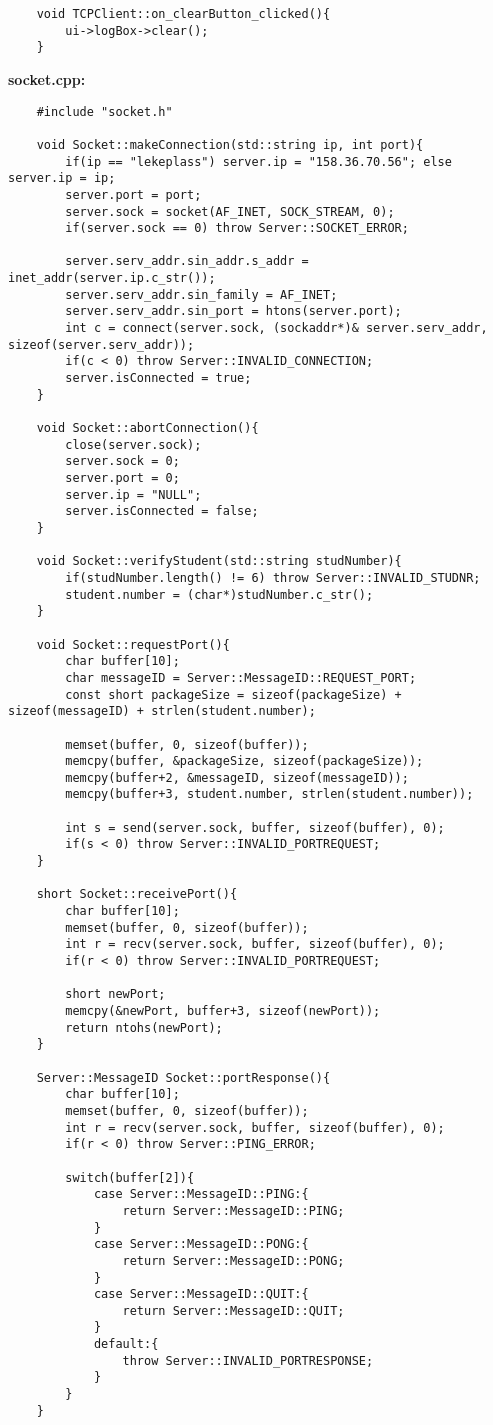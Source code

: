 \begin{lstlisting}
	void TCPClient::on_clearButton_clicked(){
		ui->logBox->clear();
	}
\end{lstlisting}

\newpage
\textbf{socket.cpp:}
\begin{lstlisting}
	#include "socket.h"

	void Socket::makeConnection(std::string ip, int port){
		if(ip == "lekeplass") server.ip = "158.36.70.56"; else server.ip = ip;
		server.port = port;
		server.sock = socket(AF_INET, SOCK_STREAM, 0);
		if(server.sock == 0) throw Server::SOCKET_ERROR;

		server.serv_addr.sin_addr.s_addr = inet_addr(server.ip.c_str());
		server.serv_addr.sin_family = AF_INET;
		server.serv_addr.sin_port = htons(server.port);
		int c = connect(server.sock, (sockaddr*)& server.serv_addr, sizeof(server.serv_addr));
		if(c < 0) throw Server::INVALID_CONNECTION;
		server.isConnected = true;
	}

	void Socket::abortConnection(){
		close(server.sock);
		server.sock = 0;
		server.port = 0;
		server.ip = "NULL";
		server.isConnected = false;
	}

	void Socket::verifyStudent(std::string studNumber){
		if(studNumber.length() != 6) throw Server::INVALID_STUDNR;
		student.number = (char*)studNumber.c_str();
	}

	void Socket::requestPort(){
		char buffer[10];
		char messageID = Server::MessageID::REQUEST_PORT;
		const short packageSize = sizeof(packageSize) + sizeof(messageID) + strlen(student.number);

		memset(buffer, 0, sizeof(buffer));
		memcpy(buffer, &packageSize, sizeof(packageSize));
		memcpy(buffer+2, &messageID, sizeof(messageID));
		memcpy(buffer+3, student.number, strlen(student.number));

		int s = send(server.sock, buffer, sizeof(buffer), 0);
		if(s < 0) throw Server::INVALID_PORTREQUEST;
	}

	short Socket::receivePort(){
		char buffer[10];
		memset(buffer, 0, sizeof(buffer));
		int r = recv(server.sock, buffer, sizeof(buffer), 0);
		if(r < 0) throw Server::INVALID_PORTREQUEST;

		short newPort;
		memcpy(&newPort, buffer+3, sizeof(newPort));
		return ntohs(newPort);
	}

	Server::MessageID Socket::portResponse(){
		char buffer[10];
		memset(buffer, 0, sizeof(buffer));
		int r = recv(server.sock, buffer, sizeof(buffer), 0);
		if(r < 0) throw Server::PING_ERROR;

		switch(buffer[2]){
			case Server::MessageID::PING:{
				return Server::MessageID::PING;
			}
			case Server::MessageID::PONG:{
				return Server::MessageID::PONG;
			}
			case Server::MessageID::QUIT:{
				return Server::MessageID::QUIT;
			}
			default:{
				throw Server::INVALID_PORTRESPONSE;
			}
		}
	}


\end{lstlisting}
